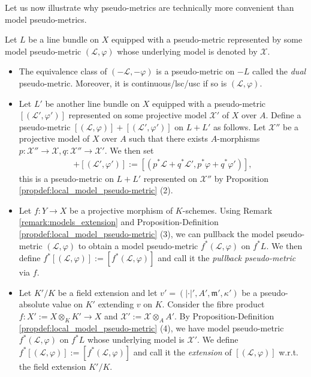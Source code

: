 \documentclass [11pt,reqno]{amsart}
\newcommand{\1}{\mathmybb{1}}
\def\cL{{\mathcal{L}}}
\def\cX{{\mathcal{X}}}
\def\m{\mathfrak m}
\begin{document}
Let us now illustrate why pseudo-metrics are technically more convenient than model pseudo-metrics.

\begin{proposition-definition}
\label{propdef:local_pseudo-metric}
Let $L$ be a line bundle on $X$ equipped with a pseudo-metric represented by some model pseudo-metric $(\cL,\varphi)$ whose underlying model is denoted by $\cX$.
\begin{itemize}
	\item[(1)] The equivalence class of $(-\cL,-\varphi)$ is a pseudo-metric on $-L$ called the \emph{dual} pseudo-metric. Moreover, it is continuous/lsc/usc if so is $(\cL,\varphi)$.
	\item[(2)] Let $L'$ be another line bundle on $X$ equipped with a pseudo-metric $[(\cL',\varphi')]$ represented on some projective model $\cX'$ of $X$ over $A$. Define a pseudo-metric $[(\cL,\varphi)]+[(\cL',\varphi')]$ on $L+L'$ as follows. Let $\cX''$ be a projective model of $X$ over $A$ such that there exists $A$-morphisms $p:\cX''\to \cX,q:\cX''\to \cX'$. We then set 
	\begin{align*}
	[(\cL,\varphi)]+[(\cL',\varphi')]:=[(p^{\ast}\cL+q^{\ast}\cL',p^{\ast}\varphi+q^{\ast}\varphi')],
	\end{align*}
	this is a pseudo-metric on $L+L'$ represented on $\cX''$ by Proposition \ref{propdef:local_model_pseudo-metric} (2).
	\item[(3)] Let $f:Y \to X$ be a projective morphism of $K$-schemes. Using Remark \ref{remark:models_extension} and Proposition-Definition \ref{propdef:local_model_pseudo-metric} (3), we can pullback the model pseudo-metric $(\cL,\varphi)$ to obtain a model pseudo-metric $f^{\ast}(\cL,\varphi)$ on $f^{\ast}L$. We then define $f^{\ast}[(\cL,\varphi)]:=[f^{\ast}(\cL,\varphi)]$ and call it the \emph{pullback pseudo-metric} via $f$.
	\item[(4)] Let $K'/K$ be a field extension and let $v'=(|\cdot|',A',\m',\kappa')$ be a pseudo-absolute value on $K'$ extending $v$ on $K$. Consider the fibre product $f:X':=X\otimes_{K}K'\to X$ and $\cX':=\cX\otimes_{A}A'$. By Proposition-Definition \ref{propdef:local_model_pseudo-metric} (4), we have model pseudo-metric $f^{\ast}(\cL,\varphi)$ on $f^{\ast}L$ whose underlying model is $\cX'$. We define $f^{\ast}[(\cL,\varphi)]:=[f^{\ast}(\cL,\varphi)]$ and call it the \emph{extension} of $[(\cL,\varphi)]$ w.r.t. the field extension $K'/K$.

\end{itemize}
\end{proposition-definition}
\end{document}
